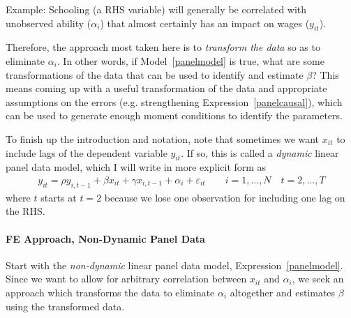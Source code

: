 \documentclass[12pt]{article}
\theoremstyle{plain}
\theoremstyle{definition}
\theoremstyle{remark}
\begin{document}
\begin{enumerate}
    Example: Schooling (a RHS variable) will generally be correlated
    with unobserved ability ($\alpha_i$) that almost certainly has an
    impact on wages ($y_{it}$).

    Therefore, the approach most taken here is to
    \emph{transform the data} so as to eliminate $\alpha_i$.
    In other words, if Model~\ref{panelmodel} is true, what are some
    transformations of the data that can be used to identify and
    estimate $\beta$?
    This means coming up with a useful transformation of the data and
    appropriate assumptions on the errors (e.g. strengthening
    Expression~\ref{panelcausal}), which can be used to generate
    enough moment conditions to identify the parameters.
\end{enumerate}
To finish up the introduction and notation, note that sometimes we want
$x_{it}$ to include lags of the dependent variable $y_{it}$.
If so, this is called a \emph{dynamic} linear panel data model, which I
will write in more explicit form as
\begin{align*}
  y_{it}
  =
  \rho y_{i,t-1}
  + \beta x_{it}
  + \gamma x_{i,t-1}
  + \alpha_i
  + \varepsilon_{it}
  \qquad
  i = 1,\ldots,N
  \quad
  t = 2,\ldots,T
\end{align*}
where $t$ starts at $t=2$ because we lose one observation
for including one lag on the RHS.


\paragraph{FE Approach, Non-Dynamic Panel Data}
Start with the \emph{non-dynamic} linear panel data model,
Expression~\ref{panelmodel}.
Since we want to allow for arbitrary correlation between $x_{it}$ and
$\alpha_i$, we seek an approach which transforms the data to eliminate
$\alpha_i$ altogether and estimates $\beta$ using the transformed data.
\end{document}
